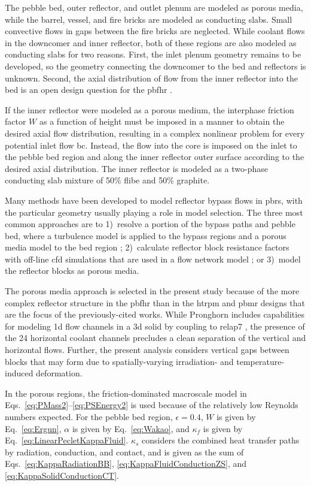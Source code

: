 The pebble bed, outer reflector, and outlet plenum are modeled as porous media, while the barrel, vessel, and fire bricks are modeled as conducting slabs. Small convective flows in gaps between the fire bricks are neglected. While coolant flows in the downcomer and inner reflector, both of these regions are also modeled as conducting slabs for two reasons. First, the inlet plenum geometry remains to be developed, so the geometry connecting the downcomer to the bed and reflectors is unknown. Second, the axial distribution of flow from the inner reflector into the bed is an open design question for the \gls{pbfhr} \cite{pbfhr,xin_wang_thesis,scarlat}. 

If the inner reflector were modeled as a porous medium, the interphase friction factor \(W\) as a function of height must be imposed in a manner to obtain the desired axial flow distribution, resulting in a complex nonlinear problem for every potential inlet flow \gls{bc}. Instead, the flow into the core is imposed on the inlet to the pebble bed region and along the inner reflector outer surface according to the desired axial distribution. The inner reflector is modeled as a two-phase conducting slab mixture of 50\% \gls{flibe} and 50\% graphite.

Many methods have been developed to model reflector bypass flows in \glspl{pbr}, with the particular geometry usually playing a role in model selection. The three most common approaches are to 1)~resolve a portion of the bypass paths and pebble bed, where a turbulence model is applied to the bypass regions and a porous media model to the bed region \cite{ximing,rensburg}; 2)~calculate reflector block resistance factors with off-line \gls{cfd} simulations that are used in a flow network model \cite{jun2011, liu_2018,wyk}; or 3)~model the reflector blocks as porous media.

The porous media approach is selected in the present study because of the more complex reflector structure in the \gls{pbfhr} than in the \gls{htrpm} and \gls{pbmr} designs that are the focus of the previously-cited works. While Pronghorn includes capabilities for modeling \gls{1d} flow channels in a \gls{3d} solid by coupling to \gls{relap7} \cite{nrc_2020}, the presence of the 24 horizontal coolant channels precludes a clean separation of the vertical and horizontal flows. Further, the present analysis considers vertical gaps between blocks that may form due to spatially-varying irradiation- and temperature-induced deformation. 

In the porous regions, the friction-dominated macroscale model in Eqs.\ \eqref{eq:PMass2}--\eqref{eq:PSEnergy2} is used because of the relatively low Reynolds numbers expected. For the pebble bed region, \(\epsilon=0.4\), \(W\) is given by Eq.\ \eqref{eq:Ergun}, \(\alpha\) is given by Eq.\ \eqref{eq:Wakao}, and \(\kappa_f\) is given by Eq.\ \eqref{eq:LinearPecletKappaFluid}. \(\kappa_s\) considers the combined heat transfer paths by radiation, conduction, and contact, and is given as the sum of Eqs.\ \eqref{eq:KappaRadiationBB}, \eqref{eq:KappaFluidConductionZS}, and \eqref{eq:KappaSolidConductionCT}. 

